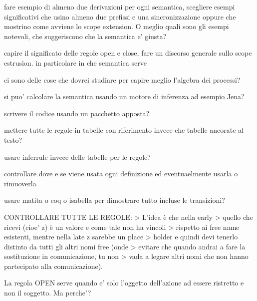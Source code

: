 
fare esempio di almeno due derivazioni per ogni semantica, scegliere esempi significativi che usino almeno due prefissi e una sincronizzazione oppure che mostrino come avviene lo scope extension.
O meglio quali sono gli esempi notevoli, che suggeriscono che la semantica e' giusta?

capire il significato delle regole open e close, fare un discorso generale sullo scope estrusion. in particolare in che semantica serve

ci sono delle cose che dovrei studiare per capire meglio l'algebra dei processi?

si puo' calcolare la semantica usando un motore di inferenza ad esempio Jena?

scrivere il codice usando un pacchetto apposta?

mettere tutte le regole in tabelle con riferimento invece che tabelle ancorate al testo?

usare inferrule invece delle tabelle per le regole?

controllare dove e se viene usata ogni definizione ed eventuaelmente usarla o rimuoverla

usare matita o coq o isabella per dimostrare tutto incluse le transizioni?



CONTROLLARE TUTTE LE REGOLE:
> L’idea è che nella early
> quello che ricevi (cioe’ z) è un valore e come tale non ha vincoli
> rispetto ai free name esistenti, mentre nella late z sarebbe un place
> holder e quindi devi tenerlo distinto da tutti gli altri nomi free (onde
> evitare che quando andrai a fare la sostituzione in comunicazione, tu non
> vada a legare altri nomi che non hanno partecipato alla comunicazione). 


La regola OPEN serve quando e' solo l'oggetto dell'azione ad essere ristretto e non il soggetto. Ma perche'?

